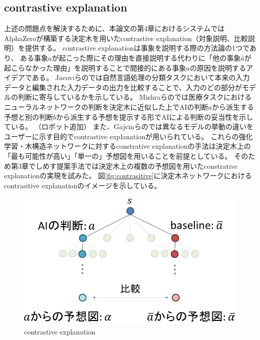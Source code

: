 \subsection{contrastive explanation}
上述の問題点を解決するために、本論文の第4章におけるシステムではAlphaZeroが構築する決定木を用いたcontrastive explanation（対象説明、比較説明）を提供する。
contrastive explanationは事象を説明する際の方法論の1つであり、
ある事象$a$が起こった際にその理由を直接説明する代わりに「他の事象$\bar{a}$が起こらなかった理由」を説明することで間接的にある事象$a$の原因を説明するアイデアである\cite{contrastive}。
Jacoviらの\cite{contrastive}では自然言語処理の分類タスクにおいて本来の入力データと編集された入力データの出力を比較することで、入力のどの部分がモデルの判断に寄与しているかを示している。
Mishraらの\cite{whyNot}では医療タスクにおけるニューラルネットワークの判断を決定木に近似した上でAIの判断$a$から派生する予想と別の判断$b$から派生する予想を提示する形でAIによる判断の妥当性を示している。
（ロボット追加）
また、Gajcinらの\cite{preference}では異なるモデルの挙動の違いをユーザーに示す目的でcontrastive explanationが用いられている。
これらの強化学習・木構造ネットワークに対するconstrative explanationの手法は決定木上の「最も可能性が高い」「単一の」予想図を用いることを前提としている。
そのため第3章でしめす提案手法では決定木上の複数の予想図を用いたconstrative explanationの実現を試みた。
図\ref{fig:contrasitive}に決定木ネットワークにおけるcontrasitive explanationのイメージを示している。
\begin{figure}[t]
	\centering
	\includegraphics[width=\linewidth]{./figure/contrastive.png}
	\caption{contrastive explanation}
	\label{fig:contrastive}
\end{figure}
